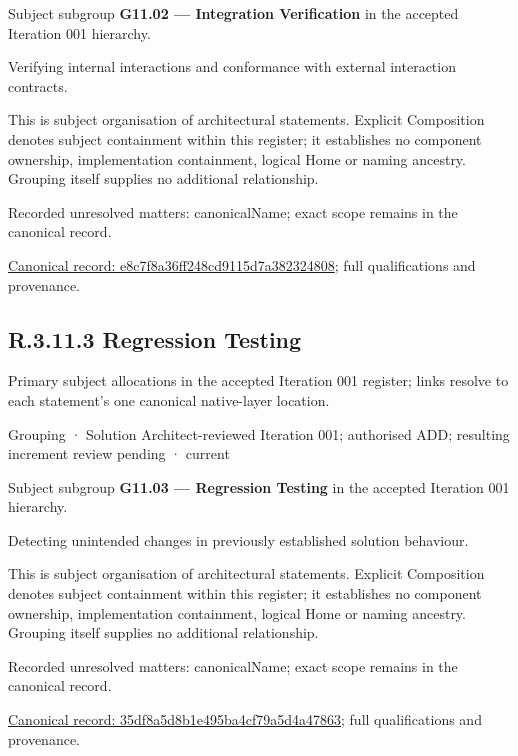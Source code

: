 Subject subgroup \textbf{G11.02 — Integration Verification} in the accepted Iteration 001 hierarchy.



Verifying internal interactions and conformance with external interaction contracts.



This is subject organisation of architectural statements. Explicit Composition denotes subject containment within this register; it establishes no component ownership, implementation containment, logical Home or naming ancestry. Grouping itself supplies no additional relationship.


{\small Recorded unresolved matters: canonicalName; exact scope remains in the canonical record.}\par
{\footnotesize \href{../../../../continuum/grouping/e8c7f8a36ff248cd9115d7a382324808.md}{Canonical record: e8c7f8a36ff248cd9115d7a382324808}; full qualifications and provenance.}\par
\subsection*{R.3.11.3 Regression Testing}
\label{navigation:R.3.11.3}

Primary subject allocations in the accepted Iteration 001 register; links resolve to each statement’s one canonical native-layer location.\par
\label{element:35df8a5d8b1e495ba4cf79a5d4a47863}
{\small Grouping · Solution Architect-reviewed Iteration 001; authorised ADD; resulting increment review pending · current}\par

Subject subgroup \textbf{G11.03 — Regression Testing} in the accepted Iteration 001 hierarchy.



Detecting unintended changes in previously established solution behaviour.



This is subject organisation of architectural statements. Explicit Composition denotes subject containment within this register; it establishes no component ownership, implementation containment, logical Home or naming ancestry. Grouping itself supplies no additional relationship.


{\small Recorded unresolved matters: canonicalName; exact scope remains in the canonical record.}\par
{\footnotesize \href{../../../../continuum/grouping/35df8a5d8b1e495ba4cf79a5d4a47863.md}{Canonical record: 35df8a5d8b1e495ba4cf79a5d4a47863}; full qualifications and provenance.}\par
